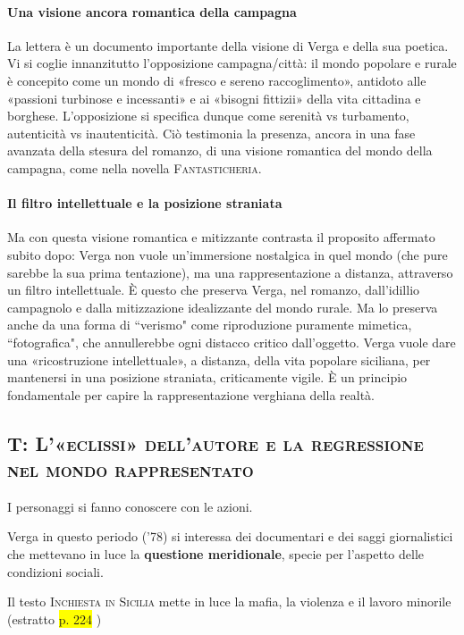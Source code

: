\documentclass{book}
\newcommand{\pagine}[1]{\colorbox{yellow}{#1}}
\begin{document}
\paragraph{Una visione ancora romantica della campagna} La lettera è un documento importante della visione di Verga e della sua poetica. Vi si coglie innanzitutto l'opposizione campagna/città: il mondo popolare e rurale è concepito come un mondo di «fresco e sereno raccoglimento», antidoto alle «passioni turbinose e incessanti» e ai «bisogni fittizii» della vita cittadina e borghese. L'opposizione si specifica dunque come serenità vs turbamento, autenticità vs inautenticità. Ciò testimonia la presenza, ancora in una fase avanzata della stesura del romanzo, di una visione romantica del mondo della campagna, come nella novella \textsc{Fantasticheria}.

\paragraph{Il filtro intellettuale e la posizione straniata} Ma con questa visione romantica e mitizzante contrasta il proposito affermato subito dopo: Verga non vuole un'immersione nostalgica in quel mondo (che pure sarebbe la sua prima tentazione), ma una rappresentazione a distanza, attraverso un filtro intellettuale. È questo che preserva Verga, nel romanzo, dall'idillio campagnolo e dalla mitizzazione idealizzante del mondo rurale. Ma lo preserva anche da una forma di “verismo" come riproduzione puramente mimetica, “fotografica", che annullerebbe ogni distacco critico dall'oggetto. Verga vuole dare una «ricostruzione intellettuale», a distanza, della vita popolare siciliana, per mantenersi in una posizione straniata, criticamente vigile. È un principio fondamentale per capire la rappresentazione verghiana della realtà.

\subsection{T: \textsc{L'«eclissi» dell'autore e la regressione nel mondo rappresentato}}

I personaggi si fanno conoscere con le azioni.

Verga in questo periodo ('78) si interessa dei documentari e dei saggi
giornalistici che mettevano in luce la \textbf{questione meridionale},
specie per l'aspetto delle condizioni sociali.

Il testo \textsc{Inchiesta in Sicilia} mette in luce la mafia, la violenza
e il lavoro minorile (estratto \pagine{p. 224} )
\end{document}
